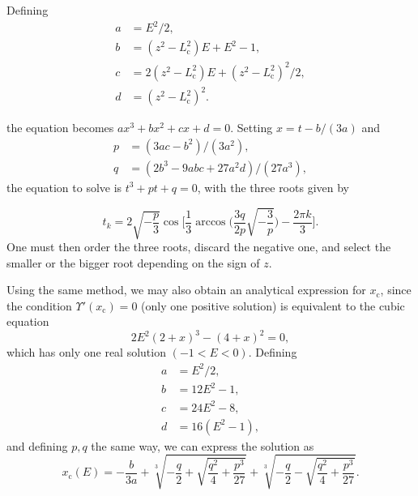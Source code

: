 \documentclass[11pt]{article}
\newcommand{\rc}{\mathrm{c}}
\newcommand{\Lc}{L_{{\mathrm{c}}}}
\newcommand{\xc}{x_{\rc}}
\begin{document}
\begin{appendices}
Defining
\begin{align*}
  a &= E^{2}/2, \\
  b &= (z^{2}-\Lc^{2})E+E^{2}-1 ,\\
  c &= 2(z^{2}-\Lc^{2})E + (z^{2}-\Lc^{2})^{2}/2 ,\\
  d &= (z^{2}-\Lc^{2})^{2} .
\end{align*}

the equation becomes $a x^{3}+b x^{2}+c x+d = 0$. Setting $x=t-b/(3a)$ and
\begin{align*}
  p &= (3ac -b^{2})/(3a^{2}), \\
  q &= (2b^{3}-9abc+27a^{2}d)/(27a^{3}) ,
  \end{align*}
the equation to solve is $t^{3}+pt+q=0$, with the three roots given by

\begin{equation}
  t_{k} = 2\sqrt{-\frac{p}{3}} \cos\bigg[\frac{1}{3}\arccos\bigg(\frac{3q}{2p} \sqrt{-\frac{3}{p}}\bigg)-\frac{2\pi k}{3}\bigg] .
  \label{eq:Viete_formula_varphi(z)}
\end{equation}
One must then order the three roots, discard the negative one, and select the smaller or the bigger root depending on the sign of $z$.

Using the same method, we may also obtain an analytical expression for $\xc$, since the condition $\Upsilon'(\xc)=0$ (only one positive solution) is equivalent to the cubic equation
\begin{equation}
   2E^{2}(2+x)^{3} - (4+x)^{2} = 0 ,
  \label{eq:xcPlummer}
\end{equation}
which has only one real solution $(-1<E<0)$. Defining
\begin{align*}
  a &= E^{2}/2, \\
  b &= 12E^{2}-1 ,\\
  c &= 24E^{2}-8,\\
  d &= 16(E^{2}-1) ,
\end{align*}
and defining $p,q$ the same way, we can express the solution as
\begin{equation}
  \xc(E) = -\frac{b}{3a} + \sqrt[3]{-\frac{q}{2}+\sqrt{\frac{q^{2}}{4}+\frac{p^{3}}{27}}} + \sqrt[3]{-\frac{q}{2}-\sqrt{\frac{q^{2}}{4}+\frac{p^{3}}{27}}} .
  \label{eq:xcPlummer}
  \end{equation}


\end{appendices}
\end{document}
